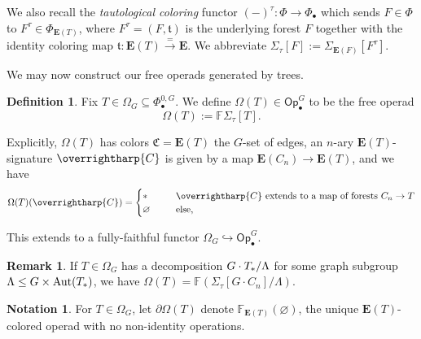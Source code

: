 \documentclass[a4paper,10pt
,draft
]{article}%
\numberwithin{equation}{section}
\numberwithin{figure}{section}
\theoremstyle{definition} %
\newtheorem{definition}[equation]{Definition}%
\newtheorem{remark}[equation]{Remark}%
\newtheorem{notation}[equation]{Notation}%
\newcommand{\into}{\hookrightarrow}%
\newcommand{\vect}[1]{\text{\overrightharp{\ensuremath{#1}}}}
\newcommand{\Op}{\mathsf{Op}}%
\DeclareMathOperator{\Aut}{Aut}%
\newcommand{\1}{\ensuremath{\mathbbm 1}}%
\begin{document}
We also recall the \textit{tautological coloring} functor $(-)^\tau \colon \Phi \to \Phi_{\bullet}$
which sends $F \in \Phi$ to $F^\tau \in \Phi_{\boldsymbol{E}(T)}$,
where $F^\tau = (F,\mathfrak t)$ is the underlying forest $F$ together with the identity coloring map $\mathfrak t \colon \boldsymbol{E}(T) \xrightarrow{=} \boldsymbol{E}$.
We abbreviate $\Sigma_\tau[F] := \Sigma_{\boldsymbol{E}(F)}[F^\tau]$.

We may now construct our free operads generated by trees.

\begin{definition}
      \label{OT_DEF}
      Fix $T \in \Omega_G \subseteq \Phi^{0,G}_\bullet$.
      We define $\Omega(T) \in \Op_\bullet^G$ to be the free operad
      \[
            \Omega(T) := \mathbb F \Sigma_\tau[T].
      \]
\end{definition}
Explicitly, $\Omega(T)$ has colors $\mathfrak C = \boldsymbol{E}(T)$ the $G$-set of edges,
an $n$-ary $\boldsymbol{E}(T)$-signature $\vect C$ is given by a map $\boldsymbol{E}(C_n) \to \boldsymbol{E}(T)$,
and we have
\begin{equation}
      \label{OMEGADEF_EQ}
      \Omega(T)(\vect C) =
      \begin{cases}
            \** \qquad & \mbox{$\vect C$ extends to a map of forests $C_n \to T$}
            \\
            \varnothing & \text{else,}
      \end{cases}
\end{equation}

This extends to a fully-faithful functor $\Omega_G \into \Op_\bullet^G$.

\begin{remark}
      If $T \in \Omega_G$ has a decomposition $G \cdot T_{\**}/\Lambda$ for some graph subgroup $\Lambda \leq G \times \Aut(T_{\**})$,
we have $\Omega(T) = \mathbb{F} \left( \Sigma_{\tau}[G \cdot C_n]/\Lambda \right)$. %
\end{remark}

\begin{notation}
      For $T \in \Omega_G$,  let $\partial \Omega(T)$ denote $\mathbb F_{\boldsymbol{E}(T)}(\varnothing)$,
      the unique $\boldsymbol{E}(T)$-colored operad with no non-identity operations.
\end{notation}
\end{document}
